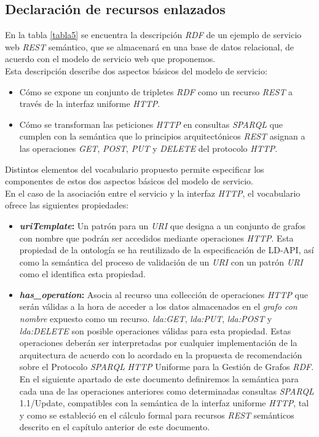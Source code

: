 \subsection{Declaraci\'on de recursos enlazados}

En la tabla \ref{tabla5} se encuentra la descripci\'on \textit{RDF} de un ejemplo de servicio web \textit{REST} sem\'antico, que se almacenar\'a en una base de datos relacional, de acuerdo con el modelo de servicio web que proponemos.\\
Esta descripci\'on describe dos aspectos b\'asicos del modelo de servicio:

\begin{itemize}
\item C\'omo se expone un conjunto de tripletes \textit{RDF} como un recurso \textit{REST} a trav\'es de la interfaz uniforme \textit{HTTP}.
\item C\'omo se transforman las peticiones \textit{HTTP} en consultas \textit{SPARQL} que cumplen con la sem\'antica que lo principios arquitect\'onicos \textit{REST} asignan a las operaciones \textit{GET}, \textit{POST}, \textit{PUT} y \textit{DELETE} del protocolo \textit{HTTP}.
\end{itemize}

Distintos elementos del vocabulario propuesto permite especificar los componentes de estos dos aspectos b\'asicos del modelo de servicio.\\
En el caso de la asociaci\'on entre el servicio y la interfaz \textit{HTTP}, el vocabulario ofrece las siguientes propiedades:

\begin{itemize}

\item \textbf{\textit{uriTemplate}:} Un patr\'on para un \textit{URI} que designa a un conjunto de grafos con nombre que podr\'an ser accedidos mediante operaciones \textit{HTTP}.  Esta propiedad de la ontolog\'ia se ha reutilizado de la especificaci\'on de LD-API, as\'i como la sem\'antica del proceso de validaci\'on de un \textit{URI} con un patr\'on \textit{URI} como el identifica esta propiedad.
\item \textbf{\textit{has\_operation}:} Asocia al recurso una collecci\'on de operaciones \textit{HTTP} que ser\'an v\'alidas a la hora de acceder a los datos almacenados en el \textit{grafo con nombre} expuesto como un recurso. \textit{lda:GET}, \textit{lda:PUT}, \textit{lda:POST} y \textit{lda:DELETE} son posible operaciones v\'alidas para esta propiedad. Estas operaciones deber\'an ser interpretadas por cualquier implementaci\'on de la arquitectura de acuerdo con lo acordado en la propuesta de recomendaci\'on sobre el Protocolo \textit{SPARQL} \textit{HTTP} Uniforme para la Gesti\'on de Grafos \textit{RDF}. En el siguiente apartado de este documento definiremos la sem\'antica para cada una de las operaciones anteriores como determinadas consultas \textit{SPARQL} 1.1/Update, compatibles con la sem\'antica de la interfaz uniforme \textit{HTTP}, tal y como se estableci\'o en el c\'alculo formal para recursos \textit{REST} sem\'anticos descrito en el cap\'itulo anterior de este documento.

\end{itemize}


